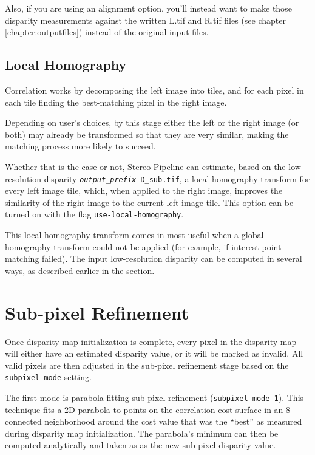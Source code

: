 Also, if you are using an alignment option, you'll instead want to
make those disparity measurements against the written L.tif and R.tif
files (see chapter \ref{chapter:outputfiles}) instead of the original input files.

\subsection{Local Homography}
\label{sec:local_hom}

Correlation works by decomposing the left image into tiles, and for each
pixel in each tile finding the best-matching pixel in the right image.

Depending on user's choices, by this stage either the left or the right
image (or both) may already be transformed so that they are very
similar, making the matching process more likely to succeed.

Whether that is the case or not, Stereo Pipeline can estimate, based on
the low-resolution disparity
\texttt{\textit{output\_prefix}-D\_sub.tif}, a local homography transform
for every left image tile, which, when applied to the right image,
improves the similarity of the right image to the current left image tile. This
option can be turned on with the flag \texttt{use-local-homography}.

This local homography transform comes in most useful when a global
homography transform could not be applied (for example, if interest
point matching failed). The input low-resolution disparity can be
computed in several ways, as described earlier in the section.


\section{Sub-pixel Refinement}
\label{sec:subpixel}

Once disparity map initialization is complete, every pixel in the
disparity map will either have an estimated disparity value, or it
will be marked as invalid.  All valid pixels are then adjusted in the
sub-pixel refinement stage based on the \texttt{subpixel-mode}
setting. %

The first mode is parabola-fitting sub-pixel refinement
(\texttt{subpixel-mode 1}).  This technique fits a 2D parabola to
points on the correlation cost surface in an 8-connected neighborhood
around the cost value that was the ``best'' as measured during
disparity map initialization. The parabola's minimum can then be
computed analytically and taken as as the new sub-pixel disparity
value.

